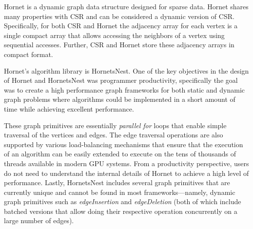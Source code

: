 Hornet \cite{green-hornet,hornet-repo} is a dynamic graph data structure designed for sparse data. Hornet shares many properties with CSR and can be considered a dynamic version of CSR\@. Specifically, for both CSR and Hornet the adjacency array for each vertex is a single compact array that allows accessing the neighbors of a vertex using sequential accesses. Further, CSR and Hornet store these adjacency arrays in compact format. %


Hornet's algorithm library is HornetsNest. One of the key objectives in the design of Hornet and HornetsNest was programmer productivity, specifically the goal was to create a high performance graph frameworks for both static and dynamic graph problems where algorithms could be implemented in a short amount of time while achieving excellent performance. %

These graph primitives are essentially \emph{parallel for} loops that enable simple traversal of the vertices and edges. The edge traversal operations are also supported by various load-balancing mechanisms that ensure that the execution of an algorithm can be easily extended to execute on the tens of thousands of threads available in modern GPU systems. From a productivity perspective, users do not need to understand the internal details of Hornet to achieve a high level of performance. %
Lastly, HornetsNest includes several graph primitives that are currently unique and cannot be found in most frameworks---namely, dynamic graph primitives such as \emph{edgeInsertion} and \emph{edgeDeletion} (both of which include batched versions that allow doing their respective operation concurrently on a large number of edges).

